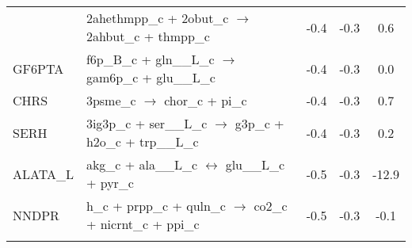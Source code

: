 \begin{longtable}{lp{}ccc}
{ACAS\_2ahbut	&	2ahethmpp\_c + 2obut\_c $\rightarrow$ 2ahbut\_c + thmpp\_c	&	-0.4	&	-0.3	&	0.6	\\
GF6PTA	&	f6p\_B\_c + gln\_\_L\_c $\rightarrow$ gam6p\_c + glu\_\_L\_c	&	-0.4	&	-0.3	&	0.0	\\
CHRS	&	3psme\_c $\rightarrow$ chor\_c + pi\_c	&	-0.4	&	-0.3	&	0.7	\\
SERH	&	3ig3p\_c + ser\_\_L\_c $\rightarrow$ g3p\_c + h2o\_c + trp\_\_L\_c	&	-0.4	&	-0.3	&	0.2	\\
ALATA\_L	&	akg\_c + ala\_\_L\_c $\leftrightarrow$ glu\_\_L\_c + pyr\_c	&	-0.5	&	-0.3	&	-12.9	\\
NNDPR	&	h\_c + prpp\_c + quln\_c $\rightarrow$ co2\_c + nicrnt\_c + ppi\_c	&	-0.5	&	-0.3	&	-0.1	\\
}
\end{longtable}
